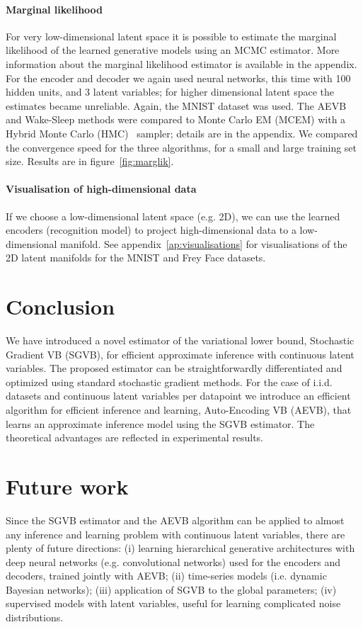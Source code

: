 \documentclass{article} \usepackage{nips13submit_e,times}
\theoremstyle{definition}
\theoremstyle{definition}
\begin{document}
\paragraph{Marginal likelihood}
For very low-dimensional latent space it is possible to estimate the marginal likelihood of the learned generative models using an MCMC estimator. More information about the marginal likelihood estimator is available in the appendix. For the encoder and decoder we again used neural networks, this time with 100 hidden units, and 3 latent variables; for higher dimensional latent space the estimates became unreliable. Again, the MNIST dataset was used.
The AEVB and Wake-Sleep methods were compared to Monte Carlo EM (MCEM) with a Hybrid Monte Carlo (HMC)~\cite{duane1987hybrid} sampler; details are in the appendix. We compared the convergence speed for the three algorithms, for a small and large training set size. Results are in figure~\ref{fig:marglik}. 

\paragraph{Visualisation of high-dimensional data} If we choose a low-dimensional latent space (e.g. 2D), we can use the learned encoders (recognition model) to project high-dimensional data to a low-dimensional manifold. See appendix~\ref{ap:visualisations} for visualisations of the 2D latent manifolds for the MNIST and Frey Face datasets.

\section{Conclusion}
We have introduced a novel estimator of the variational lower bound, Stochastic Gradient VB (SGVB), for efficient approximate inference with continuous latent variables. The proposed estimator can be straightforwardly differentiated and optimized using standard stochastic gradient methods. For the case of i.i.d. datasets and continuous latent variables per datapoint we introduce an efficient algorithm for efficient inference and learning, Auto-Encoding VB (AEVB), that learns an approximate inference model using the SGVB estimator. The theoretical advantages are reflected in experimental results. 

\section{Future work}
Since the SGVB estimator and the AEVB algorithm can be applied to almost any inference and learning problem with continuous latent variables, there are plenty of future directions: (i) learning hierarchical generative architectures with deep neural networks (e.g. convolutional networks) used for the encoders and decoders, trained jointly with AEVB; (ii) time-series models (i.e. dynamic Bayesian networks); (iii) application of SGVB to the global parameters; (iv) supervised models with latent variables, useful for learning complicated noise distributions.
\end{document}
